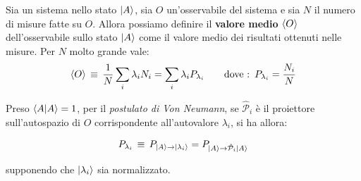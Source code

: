 \begin{mydef}
	Sia un sistema nello stato $\ket{A}$, sia $O$ un'osservabile del sistema e sia $N$ il numero di misure fatte su $O$. Allora possiamo definire il \textbf{valore medio} $\langle O \rangle$ dell'osservabile sullo stato $\ket{A}$ come il valore medio dei risultati ottenuti nelle misure. Per $N$ molto grande vale:
\begin{align*}
	\langle O \rangle \, \equiv \, \frac{1}{N} \sum_i \lambda_i N_i = \sum_i \lambda_i P_{\lambda_i} \qquad \text{dove :} \,\, \, P_{\lambda_i}=\frac{N_i}{N}
\end{align*}
\end{mydef}

	Preso $\braket{A} = 1$, per il \textit{postulato di Von Neumann}, se $\hat{\mathcal{P}}_i$ è il proiettore sull'autospazio di $O$ corrispondente all'autovalore $\lambda_i$, si ha allora:

\begin{nb}
\begin{align*}
	P_{\lambda_i} \, \equiv \, P_{\ket{A} \to \ket{\lambda_i}}  = P_{\ket{A} \to \hat{\mathcal{P}}_i \ket{A}} 
\end{align*}
\end{nb}
	
	supponendo che $\ket{\lambda_i}$ sia normalizzato.	

